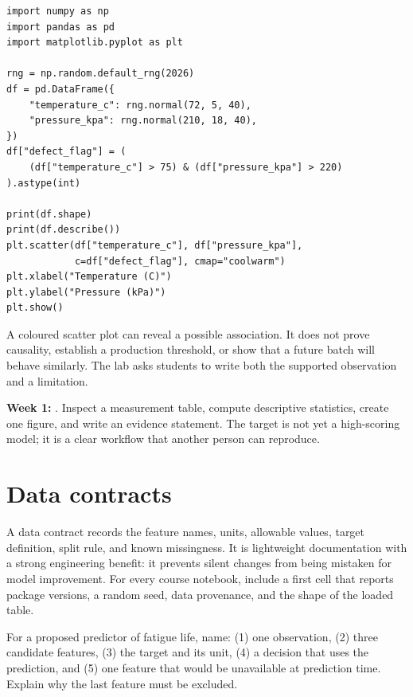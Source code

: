 \begin{lstlisting}
import numpy as np
import pandas as pd
import matplotlib.pyplot as plt

rng = np.random.default_rng(2026)
df = pd.DataFrame({
    "temperature_c": rng.normal(72, 5, 40),
    "pressure_kpa": rng.normal(210, 18, 40),
})
df["defect_flag"] = (
    (df["temperature_c"] > 75) & (df["pressure_kpa"] > 220)
).astype(int)

print(df.shape)
print(df.describe())
plt.scatter(df["temperature_c"], df["pressure_kpa"],
            c=df["defect_flag"], cmap="coolwarm")
plt.xlabel("Temperature (C)")
plt.ylabel("Pressure (kPa)")
plt.show()
\end{lstlisting}

A coloured scatter plot can reveal a possible association. It does not prove causality, establish a production threshold, or show that a future batch will behave similarly. The lab asks students to write both the supported observation and a limitation.

\begin{labbox}
\textbf{Week 1:} . Inspect a measurement table, compute descriptive statistics, create one figure, and write an evidence statement. The target is not yet a high-scoring model; it is a clear workflow that another person can reproduce.
\end{labbox}

\section{Data contracts}
A data contract records the feature names, units, allowable values, target definition, split rule, and known missingness. It is lightweight documentation with a strong engineering benefit: it prevents silent changes from being mistaken for model improvement. For every course notebook, include a first cell that reports package versions, a random seed, data provenance, and the shape of the loaded table.

\begin{checkpointbox}
For a proposed predictor of fatigue life, name: (1) one observation, (2) three candidate features, (3) the target and its unit, (4) a decision that uses the prediction, and (5) one feature that would be unavailable at prediction time. Explain why the last feature must be excluded.
\end{checkpointbox}

